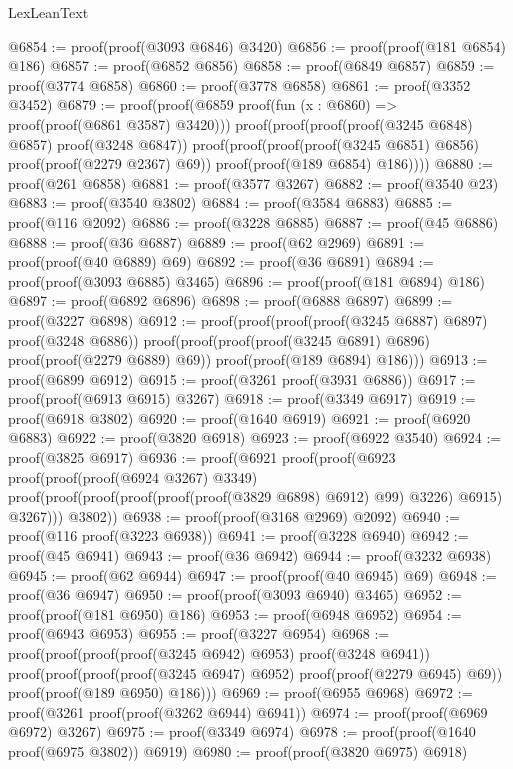 \begin{lexlean}{LexLeanText}
\begin{coremodule}
@6854 := proof(proof(@3093 @6846) @3420)
@6856 := proof(proof(@181 @6854) @186)
@6857 := proof(@6852 @6856)
@6858 := proof(@6849 @6857)
@6859 := proof(@3774 @6858)
@6860 := proof(@3778 @6858)
@6861 := proof(@3352 @3452)
@6879 := proof(proof(@6859 proof(fun (x : @6860) => proof(proof(@6861 @3587) @3420)))
      proof(proof(proof(proof(@3245 @6848) @6857) proof(@3248 @6847))
          proof(proof(proof(proof(@3245 @6851) @6856) proof(proof(@2279 @2367) @69))
              proof(proof(@189 @6854) @186))))
@6880 := proof(@261 @6858)
@6881 := proof(@3577 @3267)
@6882 := proof(@3540 @23)
@6883 := proof(@3540 @3802)
@6884 := proof(@3584 @6883)
@6885 := proof(@116 @2092)
@6886 := proof(@3228 @6885)
@6887 := proof(@45 @6886)
@6888 := proof(@36 @6887)
@6889 := proof(@62 @2969)
@6891 := proof(proof(@40 @6889) @69)
@6892 := proof(@36 @6891)
@6894 := proof(proof(@3093 @6885) @3465)
@6896 := proof(proof(@181 @6894) @186)
@6897 := proof(@6892 @6896)
@6898 := proof(@6888 @6897)
@6899 := proof(@3227 @6898)
@6912 := proof(proof(proof(proof(@3245 @6887) @6897) proof(@3248 @6886))
      proof(proof(proof(proof(@3245 @6891) @6896) proof(proof(@2279 @6889) @69))
          proof(proof(@189 @6894) @186)))
@6913 := proof(@6899 @6912)
@6915 := proof(@3261 proof(@3931 @6886))
@6917 := proof(proof(@6913 @6915) @3267)
@6918 := proof(@3349 @6917)
@6919 := proof(@6918 @3802)
@6920 := proof(@1640 @6919)
@6921 := proof(@6920 @6883)
@6922 := proof(@3820 @6918)
@6923 := proof(@6922 @3540)
@6924 := proof(@3825 @6917)
@6936 := proof(@6921
      proof(proof(@6923
            proof(proof(proof(@6924 @3267) @3349)
                proof(proof(proof(proof(proof(proof(@3829 @6898) @6912) @99) @3226) @6915) @3267)))
          @3802))
@6938 := proof(proof(@3168 @2969) @2092)
@6940 := proof(@116 proof(@3223 @6938))
@6941 := proof(@3228 @6940)
@6942 := proof(@45 @6941)
@6943 := proof(@36 @6942)
@6944 := proof(@3232 @6938)
@6945 := proof(@62 @6944)
@6947 := proof(proof(@40 @6945) @69)
@6948 := proof(@36 @6947)
@6950 := proof(proof(@3093 @6940) @3465)
@6952 := proof(proof(@181 @6950) @186)
@6953 := proof(@6948 @6952)
@6954 := proof(@6943 @6953)
@6955 := proof(@3227 @6954)
@6968 := proof(proof(proof(proof(@3245 @6942) @6953) proof(@3248 @6941))
      proof(proof(proof(proof(@3245 @6947) @6952) proof(proof(@2279 @6945) @69))
          proof(proof(@189 @6950) @186)))
@6969 := proof(@6955 @6968)
@6972 := proof(@3261 proof(proof(@3262 @6944) @6941))
@6974 := proof(proof(@6969 @6972) @3267)
@6975 := proof(@3349 @6974)
@6978 := proof(proof(@1640 proof(@6975 @3802)) @6919)
@6980 := proof(proof(@3820 @6975) @6918)

\end{coremodule}
\end{lexlean}
